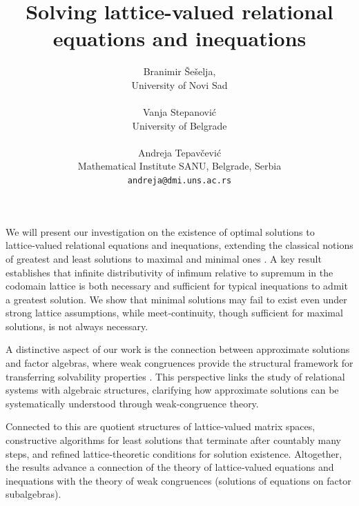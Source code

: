 \documentclass[a4paper]{article} %
\date{} %
\begin{document}
\setcounter{page}{1} %

\title{Solving lattice-valued relational equations and inequations}

\author{Branimir \v{S}e\v{s}elja,  \\ %
       University of Novi Sad\\ \\ %
       Vanja Stepanovi\'{c} \\ %
       University of Belgrade\\ \\ %
       Andreja Tepav\v{c}evi\'{c} \\
       Mathematical Institute SANU, Belgrade, Serbia \\
       \texttt{andreja@dmi.uns.ac.rs} %
       }%

\maketitle

We will present our investigation on the existence of optimal solutions to lattice‑valued relational equations and inequations, extending the classical notions of greatest and least solutions to maximal and minimal ones \cite{acta, comsis, ST, 2026}. A key result establishes that infinite distributivity of infimum relative to supremum in the codomain lattice is both necessary and sufficient for typical inequations to admit a greatest solution. We show that minimal solutions may fail to exist even under strong lattice assumptions, while meet‑continuity, though sufficient for maximal solutions, is not always necessary.

A distinctive aspect of our work is the connection between approximate solutions and factor algebras, where weak congruences provide the structural framework for transferring solvability properties \cite{gjba}. This perspective links the study of relational systems with algebraic structures, clarifying how approximate solutions can be systematically understood through weak-congruence theory.

Connected to this are quotient structures of lattice-valued matrix spaces, constructive algorithms for least solutions that terminate after countably many steps, and refined lattice‑theoretic conditions for solution existence. Altogether, the results advance a connection of the theory of lattice‑valued equations and inequations with the theory of weak congruences (solutions of equations on factor subalgebras).
\end{document}
